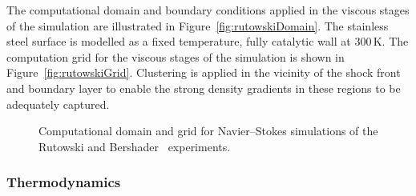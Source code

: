 \par

The computational domain and boundary conditions applied in the viscous stages of the simulation are illustrated in Figure~\ref{fig:rutowskiDomain}.
The stainless steel surface is modelled as a fixed temperature, fully catalytic wall at 300\,K.
The computation grid for the viscous stages of the simulation is shown in Figure~\ref{fig:rutowskiGrid}.
Clustering is applied in the vicinity of the shock front and boundary layer to enable the strong density gradients in these regions to be adequately captured.

\begin{figure}[h]
\centering
 \caption{Computational domain and grid for Navier--Stokes simulations of the Rutowski and Bershader~\cite{RB64} experiments.}
\end{figure}

\subsubsection{Thermodynamics}

